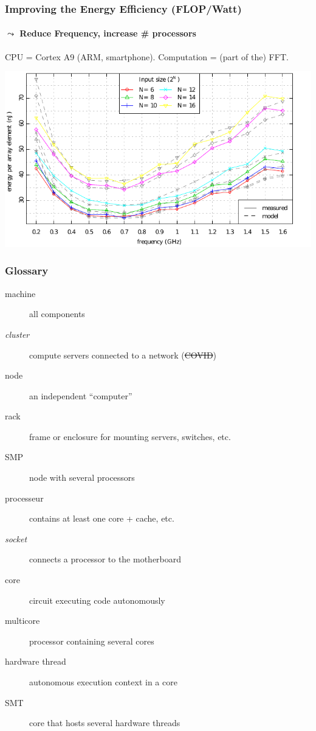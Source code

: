 \documentclass[xcolor={x11names,svgnames,psnames}]{beamer}
\begin{document}
\begin{frame}
  \frametitle{Improving the Energy Efficiency (FLOP/Watt)}
  \framesubtitle{$\leadsto$ Reduce Frequency, increase \# processors}

  \centering

  \small CPU = Cortex A9 (ARM, smartphone). Computation = (part of the) FFT. 
  
  \includegraphics[width=\textwidth]{cpu_freq_scaling.pdf}
\end{frame}


\begin{frame}
  \frametitle{Glossary}

    \begin{description}
    \item[machine] all components

    \item[\textit{cluster}] compute servers connected to a network (\sout{COVID})
      
    \item[node] an independent ``computer''

    \item[rack] frame or enclosure for mounting servers, switches, etc.

    \item[SMP] node with several processors

    \item[processeur] contains at least one core + cache, etc.
  
    \item[\emph{socket}] connects a processor to the motherboard

    \item[core] circuit executing code autonomously

    \item[multicore] processor containing several cores
  
    \item[hardware thread] autonomous execution context in a core

    \item[SMT] core that hosts several hardware threads
    \end{description}

\end{frame}
\end{document}
